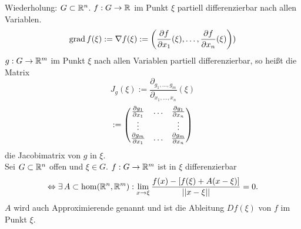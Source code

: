 \documentclass[../ana2u.tex]{subfiles}
\begin{document}
Wiederholung: \( G \subset \mathbb{R}^n \).
\( f:G\rightarrow \mathbb{R} \) im Punkt \( \xi \) partiell 
differenzierbar nach allen Variablen. 
\[ \operatorname{grad} f(\xi) := \nabla f(\xi) 
:= \left( \frac{\partial f}{\partial x_1}(\xi), 
\dots, \frac{\partial f}{\partial x_n}(\xi) \right)) \]
\( g:G\rightarrow \mathbb{R}^m \) im Punkt \( \xi \) nach 
allen Variablen partiell differenzierbar, so heißt 
die Matrix 
\[ J_g(\xi) := \frac{ \partial_{g_1, \ldots, g_m} }{\partial_{x_1, \ldots, x_n}}(\xi) \]
\[ := \begin{pmatrix}
    \frac{\partial g_1}{\partial x_1} & \dots & \frac{\partial g_1}{\partial x_n} \\
    \vdots & & \vdots \\
    \frac{\partial g_m}{\partial x_1} & \dots & \frac{\partial g_m}{\partial x_n}
\end{pmatrix} \]
die Jacobimatrix von \(g\) in \( \xi \).\\
Sei \( G \subset \mathbb{R}^n \) offen und \( \xi \in G \).
\( f:G\rightarrow \mathbb{R}^m \) ist in \(\xi \) differenzierbar 
\[ \Leftrightarrow \exists A \subset \hom(\R^n, \R^m): 
\limesx{x}{\xi} \frac{f(x) - [f(\xi) + A(x - \xi) ] }{\norm{x-\xi}} = 0. \]
\(A\) wird auch Approximierende genannt und 
ist die Ableitung \(Df(\xi)\) von \(f\) im Punkt \(\xi\).\\
\end{document}
